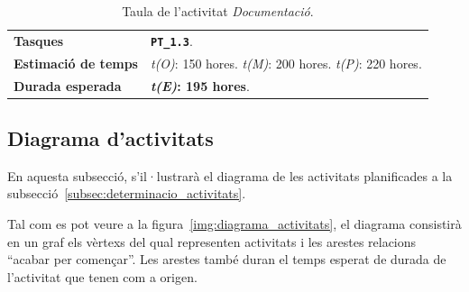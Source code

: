 \documentclass[a4paper,12pt]{ThesisStyle}
\begin{document}
\begin{table}[H]
  \begin{tabularx}{\textwidth}{l | X}
    \toprule
    \rowcolor{Gray}
    \multicolumn{2}{c}{\texttt{\textbf{A21:}} Documentació}\\
    \midrule[0.9pt]
    \textbf{Tasques}                 & \texttt{\textbf{PT\_1.3}}.\\
    \midrule
    \textbf{Estimació de temps}      & \textit{t(O)}: 150 hores.
    \newline \textit{t(M)}: 200 hores.
    \newline \textit{t(P)}: 220 hores.\\
    \midrule
    \textbf{Durada esperada}         & \textbf{\textit{t(E)}: 195 hores}.\\
    \bottomrule
  \end{tabularx}
  \caption{\label{taula:a21} Taula de l'activitat \emph{Documentació}.}
\end{table}

\newpage

\subsection{Diagrama d'activitats}
\label{subsec:diagrama_activitats}

En aquesta subsecció, s'il·lustrarà el diagrama de les activitats planificades a la subsecció~\ref{subsec:determinacio_activitats}.

Tal com es pot veure a la figura~\ref{img:diagrama_activitats}, el diagrama consistirà en un graf els vèrtexs del qual representen activitats i les arestes relacions ``acabar per començar''. Les arestes també duran el temps esperat de durada de l'activitat que tenen com a origen.
\end{document}
